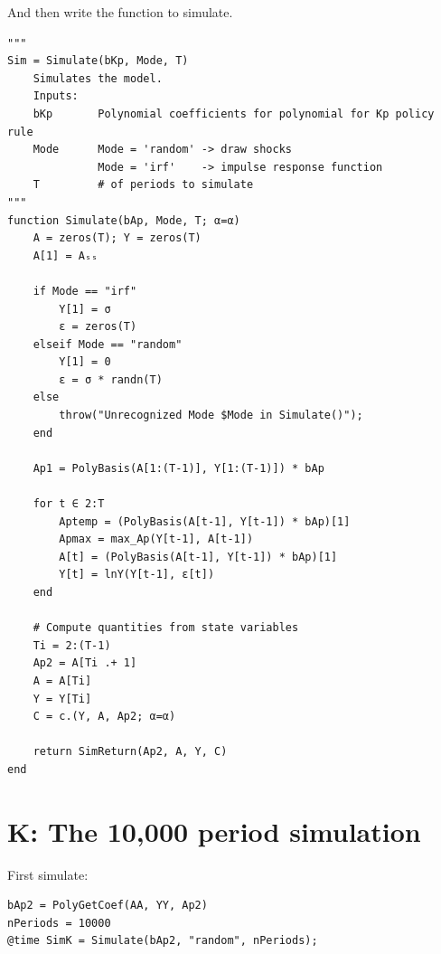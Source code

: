 \documentclass[12pt]{article}
\begin{document}
And then write the function to simulate.
\begin{lstlisting}[language=JuliaLocal, style=julia]
"""
Sim = Simulate(bKp, Mode, T)
    Simulates the model.
    Inputs:
    bKp       Polynomial coefficients for polynomial for Kp policy rule
    Mode      Mode = 'random' -> draw shocks
              Mode = 'irf'    -> impulse response function
    T         # of periods to simulate
"""
function Simulate(bAp, Mode, T; α=α)
    A = zeros(T); Y = zeros(T)
    A[1] = Aₛₛ
    
    if Mode == "irf"
        Y[1] = σ
        ε = zeros(T)
    elseif Mode == "random"
        Y[1] = 0
        ε = σ * randn(T)
    else
        throw("Unrecognized Mode $Mode in Simulate()");
    end
    
    Ap1 = PolyBasis(A[1:(T-1)], Y[1:(T-1)]) * bAp

    for t ∈ 2:T
        Aptemp = (PolyBasis(A[t-1], Y[t-1]) * bAp)[1]
        Apmax = max_Ap(Y[t-1], A[t-1])
        A[t] = (PolyBasis(A[t-1], Y[t-1]) * bAp)[1]
        Y[t] = lnY(Y[t-1], ε[t]) 
    end
    
    # Compute quantities from state variables
    Ti = 2:(T-1)
    Ap2 = A[Ti .+ 1]
    A = A[Ti]
    Y = Y[Ti]
    C = c.(Y, A, Ap2; α=α)

    return SimReturn(Ap2, A, Y, C)
end
\end{lstlisting}










\newpage
\section*{K: The 10,000 period simulation}

First simulate:
\begin{lstlisting}[language=JuliaLocal, style=julia]
bAp2 = PolyGetCoef(AA, YY, Ap2)
nPeriods = 10000
@time SimK = Simulate(bAp2, "random", nPeriods);
\end{lstlisting}
\end{document}
